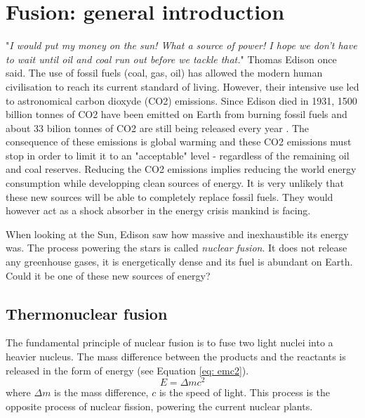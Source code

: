 \setchapterpreamble[u]{\margintoc}
\chapter{Fusion: general introduction}\label{Chapter1}

"\textit{I would put my money on the sun! What a source of power! I hope we don't have to wait until oil and coal run out before we tackle that.}" Thomas Edison once said.
The use of fossil fuels (coal, gas, oil) has allowed the modern human civilisation to reach its current standard of living.
However, their intensive use led to astronomical carbon dioxyde (CO2) emissions.
Since Edison died in 1931, 1500 billion tonnes of CO2 have been emitted on Earth from burning fossil fuels and about 33 bilion tonnes of CO2 are still being released every year \cite{friedlingstein_global_2021}.
The consequence of these emissions is global warming and these CO2 emissions must stop in order to limit it to an "acceptable" level - regardless of the remaining oil and coal reserves.
Reducing the CO2 emissions implies reducing the world energy consumption while developping clean sources of energy.
It is very unlikely that these new sources will be able to completely replace fossil fuels.
They would however act as a shock absorber in the energy crisis mankind is facing.

When looking at the Sun, Edison saw how massive and inexhaustible its energy was.
The process powering the stars is called \textit{nuclear fusion}.
It does not release any greenhouse gases, it is energetically dense and its fuel is abundant on Earth.
Could it be one of these new sources of energy?

\section{Thermonuclear fusion}

The fundamental principle of nuclear fusion is to fuse two light nuclei into a heavier nucleus.
The mass difference between the products and the reactants is released in the form of energy (see Equation \ref{eq: emc2}).
\begin{equation}
    E = \Delta m c^2
    \label{eq: emc2}
\end{equation}
where $\Delta m$ is the mass difference, $c$ is the speed of light.
This process is the opposite process of nuclear fission, powering the current nuclear plants.

